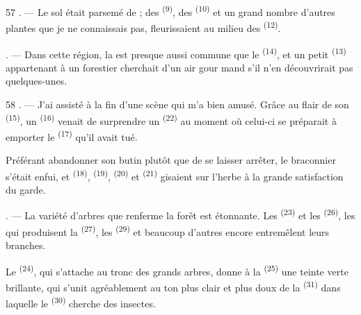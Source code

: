 \begin{VUpage}[59]{57}
. --- Le sol était parsemé de  ; des\nl
{} \textsuperscript{(9)}, des  \textsuperscript{(10)} et un grand\nl
nombre d'autres plantes que je ne connaissais pas,\nl
fleurissaient au milieu des  \textsuperscript{(12)}.

. --- Dans cette région, la  est presque aussi\nl
commune que le  \textsuperscript{(14)}, et un petit  \textsuperscript{(13)}\nl
appartenant à un forestier cherchait d'un air gour\cc
mand s'il n'en découvrirait pas quelques-unes.
\end{VUpage}

\begin{VUpage}[60]{58}
. --- J'ai assisté à la fin d'une scène qui m'a bien\nl
amusé. Grâce au flair de son  \textsuperscript{(15)}, un\nl
{} \textsuperscript{(16)} venait de surprendre un \cc
{} \textsuperscript{(22)} au moment où celui-ci se préparait à\nl
emporter le  \textsuperscript{(17)} qu'il avait tué.

\VUblancAlinea
Préférant abandonner son butin plutôt que de se\nl
laisser arrêter, le braconnier s'était enfui, et \cc
{} \textsuperscript{(18)},  \textsuperscript{(19)},  \textsuperscript{(20)} et  \textsuperscript{(21)}\nl
gisaient sur l'herbe à la grande satisfaction du garde.

. --- La variété d'arbres que renferme la forêt est\nl
étonnante. Les  \textsuperscript{(23)} et les  \textsuperscript{(26)}, les\nl
{} qui produisent la  \textsuperscript{(27)}, les  \textsuperscript{(29)} et\nl
beaucoup d'autres encore entremêlent leurs branches.

\VUblancAlinea
Le  \textsuperscript{(24)}, qui s'attache au tronc des grands\nl
arbres, donne à la  \textsuperscript{(25)} une teinte verte brillante,\nl
qui s'unit agréablement au ton plus clair et plus\nl
doux de la  \textsuperscript{(31)} dans laquelle le  \textsuperscript{(30)}\nl
cherche des insectes.


\end{VUpage}
